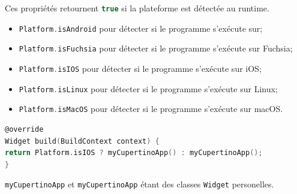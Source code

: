 \documentclass[10pt]{beamer}
\begin{document}
\begin{frame}[fragile]{\secname}
    Ces propriétés retournent \lstinline[language=c]!true! si la plateforme est détectée au runtime.
    \begin{itemize}
        \item \lstinline[language=c]!Platform.isAndroid! pour détecter si le programme s’exécute sur;
        \item \lstinline[language=c]!Platform.isFuchsia! pour détecter si le programme s’exécute sur Fuchsia;
        \item \lstinline[language=c]!Platform.isIOS! pour détecter si le programme s’exécute sur iOS;
        \item \lstinline[language=c]!Platform.isLinux! pour détecter si le programme s’exécute sur Linux;
        \item \lstinline[language=c]!Platform.isMacOS! pour détecter si le programme s’exécute sur macOS.
    \end{itemize}
\end{frame}
\begin{frame}[fragile]{\secname}
    \begin{lstlisting}[language=C]
@override
Widget build(BuildContext context) {
return Platform.isIOS ? myCupertinoApp() : myCupertinoApp();
}
    \end{lstlisting}
    \lstinline[language=c]!myCupertinoApp! et \lstinline[language=c]!myCupertinoApp! étant des classes \lstinline[language=sql]!Widget! personelles.
\end{frame}
\end{document}
